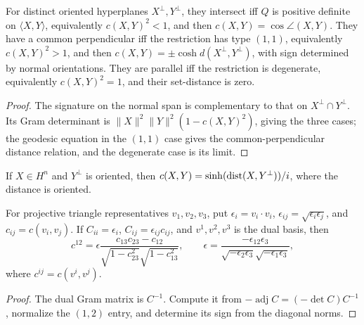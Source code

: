\begin{proposition}
\label{thurston-ch02-hyperplane-classification}
For distinct oriented hyperplanes $X^\perp,Y^\perp$, they intersect iff $Q$ is positive definite on $\langle X,Y\rangle$, equivalently $c(X,Y)^2<1$, and then $c(X,Y)=\cos\angle(X,Y)$. They have a common perpendicular iff the restriction has type $(1,1)$, equivalently $c(X,Y)^2>1$, and then $c(X,Y)=\pm\cosh d(X^\perp,Y^\perp)$, with sign determined by normal orientations. They are parallel iff the restriction is degenerate, equivalently $c(X,Y)^2=1$, and their set-distance is zero.
\end{proposition}
\begin{proof}\sketch The signature on the normal span is complementary to that on $X^\perp\cap Y^\perp$. Its Gram determinant is $\lVert X\rVert^2\lVert Y\rVert^2(1-c(X,Y)^2)$, giving the three cases; the geodesic equation in the $(1,1)$ case gives the common-perpendicular distance relation, and the degenerate case is its limit.\end{proof}

\begin{proposition}
\label{thurston-ch02-point-hyperplane}
If $X\in H^n$ and $Y^\perp$ is oriented, then $c(X,Y)=\sinh(\operatorname{dist}(X,Y^\perp))/i$, where the distance is oriented.
\end{proposition}

\begin{proposition}
\label{thurston-ch02-dual-cosine}
For projective triangle representatives $v_1,v_2,v_3$, put $\epsilon_i=v_i\cdot v_i$, $\epsilon_{ij}=\sqrt{\epsilon_i\epsilon_j}$, and $c_{ij}=c(v_i,v_j)$. If $C_{ii}=\epsilon_i$, $C_{ij}=\epsilon_{ij}c_{ij}$, and $v^1,v^2,v^3$ is the dual basis, then
\[
c^{12}=\epsilon\frac{c_{13}c_{23}-c_{12}}{\sqrt{1-c_{23}^2}\sqrt{1-c_{13}^2}},\qquad
\epsilon=\frac{-\epsilon_{12}\epsilon_3}{\sqrt{-\epsilon_2\epsilon_3}\sqrt{-\epsilon_1\epsilon_3}},
\]
where $c^{ij}=c(v^i,v^j)$.
\end{proposition}
\begin{proof}\sketch The dual Gram matrix is $C^{-1}$. Compute it from $-\operatorname{adj}C=(-\det C)C^{-1}$, normalize the $(1,2)$ entry, and determine its sign from the diagonal norms.\end{proof}

